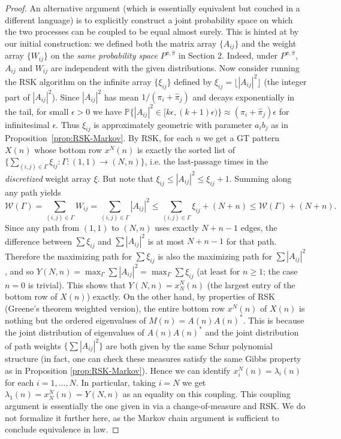 \documentclass[letterpaper,11pt,oneside,reqno]{article}
\numberwithin{equation}{section}
\theoremstyle{definition}
\begin{document}
\begin{proof}
An alternative argument (which is essentially equivalent but couched in a different language) is to explicitly construct a joint probability space on which the two processes can be coupled to be equal almost surely. This is hinted at by our initial construction: we defined both the matrix array $\{A_{ij}\}$ and the weight array $\{W_{ij}\}$ on the \emph{same probability space} $P^{\pi,\hat\pi}$ in Section 2. Indeed, under $P^{\pi,\hat\pi}$, $A_{ij}$ and $W_{ij}$ are independent with the given distributions. Now consider running the RSK algorithm on the infinite array $\{\xi_{ij}\}$ defined by $\xi_{ij} = \lfloor |A_{ij}|^2\rfloor$ (the integer part of $|A_{ij}|^2$). Since $|A_{ij}|^2$ has mean $1/(\pi_i+\hat\pi_j)$ and decays exponentially in the tail, for small $\epsilon>0$ we have $\mathbb{P}\{|A_{ij}|^2\in [k\epsilon,(k+1)\epsilon)\} \approx (\pi_i+\hat\pi_j)\epsilon$ for infinitesimal $\epsilon$. Thus $\xi_{ij}$ is approximately geometric with parameter $a_i b_j$ as in Proposition~\ref{prop:RSK-Markov}. By RSK, for each $n$ we get a GT pattern $X(n)$ whose bottom row $x^N(n)$ is exactly the sorted list of $\{\sum_{(i,j)\in\Gamma} \xi_{ij}: \Gamma: (1,1)\to(N,n)\}$, i.e. the last-passage times in the \emph{discretized} weight array $\xi$. But note that $\xi_{ij} \le |A_{ij}|^2 \le \xi_{ij}+1$. Summing along any path yields
\[ \mathcal{W}(\Gamma) = \sum_{(i,j)\in\Gamma} W_{ij} = \sum_{(i,j)\in\Gamma} |A_{ij}|^2 \le \sum_{(i,j)\in\Gamma} \xi_{ij} + (N+n) \le \mathcal{W}(\Gamma)+ (N+n). \]
Since any path from $(1,1)$ to $(N,n)$ uses exactly $N+n-1$ edges, the difference between $\sum \xi_{ij}$ and $\sum |A_{ij}|^2$ is at most $N+n-1$ for that path. Therefore the maximizing path for $\sum \xi_{ij}$ is also the maximizing path for $\sum |A_{ij}|^2$, and so $Y(N,n) = \max_{\Gamma} \sum |A_{ij}|^2 = \max_{\Gamma} \sum \xi_{ij}$ (at least for $n\ge1$; the case $n=0$ is trivial). This shows that $Y(N,n) = x^N_N(n)$ (the largest entry of the bottom row of $X(n)$) exactly. On the other hand, by properties of RSK (Greene's theorem weighted version), the entire bottom row $x^N(n)$ of $X(n)$ is nothing but the ordered eigenvalues of $M(n) = A(n)A(n)^*$. This is because the joint distribution of eigenvalues of $A(n)A(n)^*$ and the joint distribution of path weights $\{\sum |A_{ij}|^2\}$ are both given by the same Schur polynomial structure (in fact, one can check these measures satisfy the same Gibbs property as in Proposition \ref{prop:RSK-Markov}). Hence we can identify $x^N_i(n) = \lambda_i(n)$ for each $i=1,\dots,N$. In particular, taking $i=N$ we get $\lambda_1(n) = x^N_N(n) = Y(N,n)$ as an equality on this coupling. This coupling argument is essentially the one given in \cite{diekerWarren2008determinantal} via a change-of-measure and RSK. We do not formalize it further here, as the Markov chain argument is sufficient to conclude equivalence in law.
\end{proof}
\end{document}
